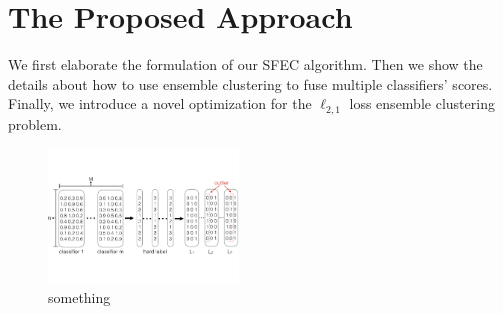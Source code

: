 \documentclass[letterpaper]{article}
\begin{document}


\section{The Proposed Approach}
We first elaborate the formulation of our SFEC algorithm. Then we show the details about how to use ensemble clustering to fuse multiple classifiers' scores. Finally, we introduce a novel optimization for the $\ell_{2,1}$ loss ensemble clustering problem.

\begin{figure}[t]
\centering\includegraphics[width=0.45\textwidth]{resource/framework.pdf}
\caption{something}\label{fig:framework}
\end{figure}
\end{document}
